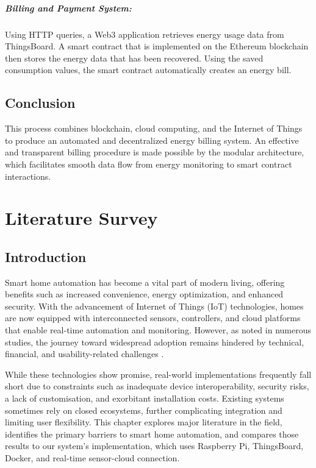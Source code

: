 \documentclass[a4paper,12pt]{report}
\begin{document}
\paragraph{Billing and Payment System:} Using HTTP queries, a Web3 application retrieves energy usage data from ThingsBoard. A smart contract that is implemented on the Ethereum blockchain then stores the energy data that has been recovered. Using the saved consumption values, the smart contract automatically creates an energy bill.

\section{Conclusion}

This process combines blockchain, cloud computing, and the Internet of Things to produce an automated and decentralized energy billing system. An effective and transparent billing procedure is made possible by the modular architecture, which facilitates smooth data flow from energy monitoring to smart contract interactions.

\chapter{Literature Survey}

\section{Introduction}
Smart home automation has become a vital part of modern living, offering benefits such as increased convenience, energy optimization, and enhanced security. With the advancement of Internet of Things (IoT) technologies, homes are now equipped with interconnected sensors, controllers, and cloud platforms that enable real-time automation and monitoring. However, as noted in numerous studies, the journey toward widespread adoption remains hindered by technical, financial, and usability-related challenges \cite{julies}\cite{Zhang2022TheCS}\cite{Ahmed02102021}.

While these technologies show promise, real-world implementations frequently fall short due to constraints such as inadequate device interoperability, security risks, a lack of customisation, and exorbitant installation costs.  Existing systems sometimes rely on closed ecosystems, further complicating integration and limiting user flexibility.  This chapter explores major literature in the field, identifies the primary barriers to smart home automation, and compares those results to our system's implementation, which uses Raspberry Pi, ThingsBoard, Docker, and real-time sensor-cloud connection.
\end{document}

